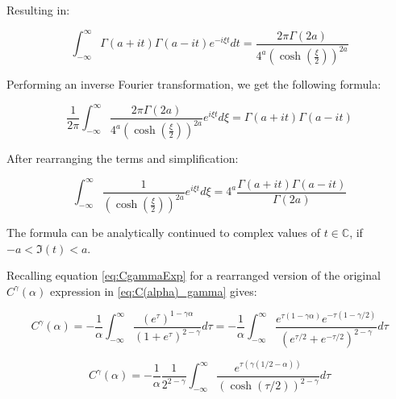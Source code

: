 \documentclass{article}
\theoremstyle{definition}
\begin{document}
Resulting in:

\begin{equation}
        \int_{-\infty}^\infty \Gamma(a+i t) \Gamma(a-i t) e^{-i \xi t} d t = 
        \frac{2 \pi \Gamma(2 a)}
        {4^a 
        \left (
        \cosh \left ( \frac{\xi}{2} \right )
        \right )^{2 a}}
\end{equation}

Performing an inverse Fourier transformation, we get the following formula:

\begin{equation}
    \frac{1}{2 \pi}
    \int_{-\infty}^\infty
    \frac{2 \pi \Gamma(2 a)}
        {4^a 
        \left (
        \cosh \left ( \frac{\xi}{2} \right )
        \right )^{2 a}}
        e^{i \xi t} d \xi =
        \Gamma(a+i t) \Gamma(a-i t)
\end{equation}

After rearranging the terms and simplification:

\begin{equation}
\label{eq:CoshInvFourierRamanujan}
    \int_{-\infty}^\infty
    \frac{1}
        { 
        \left (
        \cosh \left ( \frac{\xi}{2} \right )
        \right )^{2 a}}
        e^{i \xi t} d \xi =
        4^a \frac{\Gamma(a+i t) \Gamma(a-i t)}
        {{\Gamma(2 a)}}
\end{equation}

The formula can be analytically continued to complex values of $t \in \mathbb{C}$, if $-a < \Im(t) < a$.

Recalling equation \eqref{eq:CgammaExp} for a rearranged version of the original $C^\gamma(\alpha)$ expression in \eqref{eq:C(alpha)_gamma} gives:

\begin{equation}
    C^\gamma(\alpha) = - \frac{1}{\alpha} \int_{-\infty}^\infty
    \frac{\left ( e^\tau \right )^{1-\gamma \alpha}}{
    \left (
    1+e^\tau
    \right )^{2-\gamma}
    }
    d \tau = 
    - \frac{1}{\alpha} \int_{-\infty}^\infty
    \frac{e^{\tau(1-\gamma \alpha)} e^{-\tau (1-\gamma/2)}}{
    \left (
    e^{\tau/2}+e^{-\tau/2}
    \right )^{2-\gamma}
    }
    d \tau
\end{equation}

\begin{equation}
\label{eq:cosh^2a}
    C^\gamma(\alpha)
    = 
    - \frac{1}{\alpha} 
    \frac{1}{2^{2-\gamma}}
    \int_{-\infty}^\infty
    \frac{e^{\tau(\gamma (1/2-\alpha))}}
    {
    \left (
    \cosh(\tau/2)
    \right )^{2-\gamma}
    }
    d \tau
\end{equation}
\end{document}
